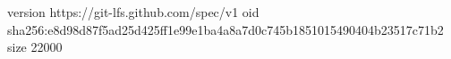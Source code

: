 version https://git-lfs.github.com/spec/v1
oid sha256:e8d98d87f5ad25d425ff1e99e1ba4a8a7d0c745b1851015490404b23517c71b2
size 22000
